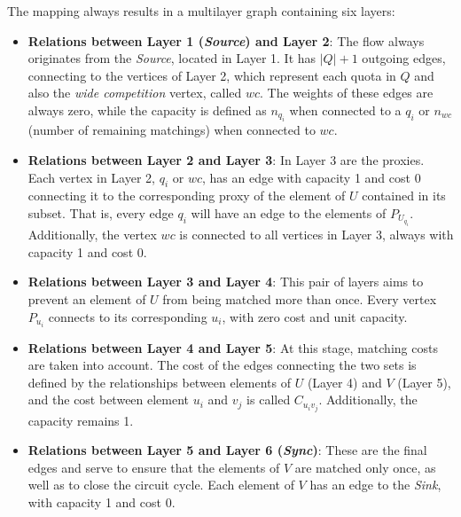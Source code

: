             The mapping always results in a multilayer graph containing six layers:
            
            \begin{itemize}
                \item \textbf{Relations between Layer 1 (\textit{Source}) and Layer 2}: The flow always originates from the \textit{Source}, located in Layer 1. It has $|Q|+1$ outgoing edges, connecting to the vertices of Layer 2, which represent each quota in $Q$ and also the \textit{wide competition} vertex, called $wc$. The weights of these edges are always zero, while the capacity is defined as $n_{q_i}$ when connected to a $q_i$ or $n_{wc}$ (number of remaining matchings) when connected to $wc$.
                
                \item \textbf{Relations between Layer 2 and Layer 3}: In Layer 3 are the proxies. Each vertex in Layer 2, $q_i$ or $wc$, has an edge with capacity 1 and cost 0 connecting it to the corresponding proxy of the element of $U$ contained in its subset. That is, every edge $q_i$ will have an edge to the elements of $P_{U_{q_i}}$. Additionally, the vertex $wc$ is connected to all vertices in Layer 3, always with capacity 1 and cost 0.
                
                \item \textbf{Relations between Layer 3 and Layer 4}: This pair of layers aims to prevent an element of $U$ from being matched more than once. Every vertex $P_{u_i}$ connects to its corresponding $u_i$, with zero cost and unit capacity.
                
                \item \textbf{Relations between Layer 4 and Layer 5}: At this stage, matching costs are taken into account. The cost of the edges connecting the two sets is defined by the relationships between elements of $U$ (Layer 4) and $V$ (Layer 5), and the cost between element $u_i$ and $v_j$ is called $C_{u_i v_j}$. Additionally, the capacity remains 1.
                
                \item \textbf{Relations between Layer 5 and Layer 6 (\textit{Sync})}: These are the final edges and serve to ensure that the elements of $V$ are matched only once, as well as to close the circuit cycle. Each element of $V$ has an edge to the \textit{Sink}, with capacity 1 and cost 0.
            \end{itemize}
            
